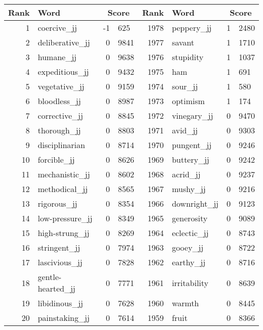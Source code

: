 \begin{table}[tbp]
    \begin{tabular}{| rlr@{.}l | rlr@{.}l |}
    \hline
    \textbf{Rank} & \textbf{Word} & \multicolumn{2}{c|}{\textbf{Score}} & \textbf{Rank} & \textbf{Word} & \multicolumn{2}{c|}{\textbf{Score}} \\
    \hline
    1 & coercive\_jj & -1 & 625    &    1978 & peppery\_jj & 1 & 2480 \\
    2 & deliberative\_jj & 0 & 9841    &    1977 & savant & 1 & 1710 \\
    3 & humane\_jj & 0 & 9638    &    1976 & stupidity & 1 & 1037 \\
    4 & expeditious\_jj & 0 & 9432    &    1975 & ham & 1 & 691 \\
    5 & vegetative\_jj & 0 & 9159    &    1974 & sour\_jj & 1 & 580 \\
    6 & bloodless\_jj & 0 & 8987    &    1973 & optimism & 1 & 174 \\
    7 & corrective\_jj & 0 & 8845    &    1972 & vinegary\_jj & 0 & 9470 \\
    8 & thorough\_jj & 0 & 8803    &    1971 & avid\_jj & 0 & 9303 \\
    9 & disciplinarian & 0 & 8714    &    1970 & pungent\_jj & 0 & 9246 \\
    10 & forcible\_jj & 0 & 8626    &    1969 & buttery\_jj & 0 & 9242 \\
    11 & mechanistic\_jj & 0 & 8602    &    1968 & acrid\_jj & 0 & 9237 \\
    12 & methodical\_jj & 0 & 8565    &    1967 & mushy\_jj & 0 & 9216 \\
    13 & rigorous\_jj & 0 & 8354    &    1966 & downright\_jj & 0 & 9123 \\
    14 & low-pressure\_jj & 0 & 8349    &    1965 & generosity & 0 & 9089 \\
    15 & high-strung\_jj & 0 & 8269    &    1964 & eclectic\_jj & 0 & 8743 \\
    16 & stringent\_jj & 0 & 7974    &    1963 & gooey\_jj & 0 & 8722 \\
    17 & lascivious\_jj & 0 & 7828    &    1962 & earthy\_jj & 0 & 8716 \\
    18 & gentle-hearted\_jj & 0 & 7771    &    1961 & irritability & 0 & 8639 \\
    19 & libidinous\_jj & 0 & 7628    &    1960 & warmth & 0 & 8445 \\
    20 & painstaking\_jj & 0 & 7614    &    1959 & fruit & 0 & 8366 \\

\end{tabular}
\end{table}
